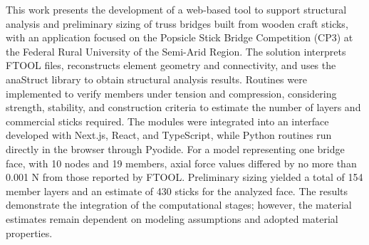 This work presents the development of a web-based tool to support structural analysis and preliminary sizing of truss bridges built from wooden craft sticks, with an application focused on the Popsicle Stick Bridge Competition (CP3) at the Federal Rural University of the Semi-Arid Region. The solution interprets FTOOL files, reconstructs element geometry and connectivity, and uses the anaStruct library to obtain structural analysis results. Routines were implemented to verify members under tension and compression, considering strength, stability, and construction criteria to estimate the number of layers and commercial sticks required. The modules were integrated into an interface developed with Next.js, React, and TypeScript, while Python routines run directly in the browser through Pyodide. For a model representing one bridge face, with 10 nodes and 19 members, axial force values differed by no more than 0.001 N from those reported by FTOOL. Preliminary sizing yielded a total of 154 member layers and an estimate of 430 sticks for the analyzed face. The results demonstrate the integration of the computational stages; however, the material estimates remain dependent on modeling assumptions and adopted material properties.

